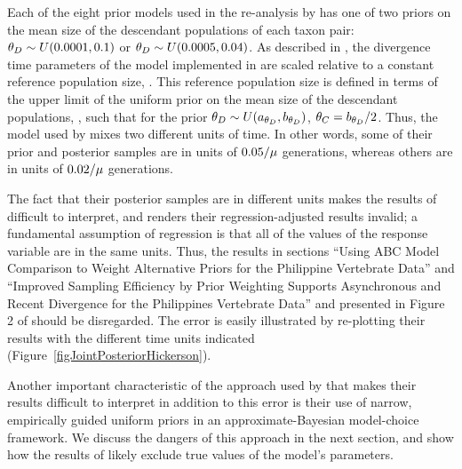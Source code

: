\documentclass[letterpaper,12pt]{article}
\begin{document}
\begin{linenumbers}
Each of the eight prior models used in the re-analysis by \citet{Hickerson2013}
has one of two priors on the mean size of the descendant populations of each
taxon pair:
$\meanDescendantTheta{} \sim U(0.0001, 0.1)$ or
$\meanDescendantTheta{} \sim U(0.0005, 0.04)$.
As described in \citet{Oaks2012}, the divergence time parameters of the model
implemented in \msb are scaled relative to a constant reference population
size, .
This reference population size is defined in terms of the upper limit of the
uniform prior on the mean size of the descendant populations,
\meanDescendantTheta{}, such that for the prior $\meanDescendantTheta{} \sim
U(\uniformMin{\meanDescendantTheta{}},\uniformMax{\meanDescendantTheta{}})$,
$\myTheta{C} = \uniformMax{\meanDescendantTheta{}}/2$.
Thus, the model used by \citet{Hickerson2013} mixes two different units of
time.
In other words, some of their prior and posterior samples are in units of
$0.05/\mu$ generations, whereas others are in units of
$0.02/\mu$ generations.

The fact that their posterior samples are in different units makes the results
of \citet{Hickerson2013} difficult to interpret, and renders their
regression-adjusted results invalid; a fundamental assumption of regression is
that all of the values of the response variable are in the same units.
Thus, the results in sections ``Using ABC Model Comparison to Weight
Alternative Priors for the Philippine Vertebrate Data'' and ``Improved Sampling
Efficiency by Prior Weighting Supports Asynchronous and Recent Divergence for
the Philippines Vertebrate Data'' and presented in Figure 2 of
\citet{Hickerson2013} should be disregarded.
The error is easily illustrated by re-plotting their results with the different
time units indicated (Figure~\ref{figJointPosteriorHickerson}).

Another important characteristic of the approach used by \citet{Hickerson2013}
that makes their results difficult to interpret in addition to this error is
their use of narrow, empirically guided uniform priors in an
approximate-Bayesian model-choice framework.
We discuss the dangers of this approach in the next section, and show how the
results of \citet{Hickerson2013} likely exclude true values of the model's
parameters.




\end{linenumbers}
\end{document}

